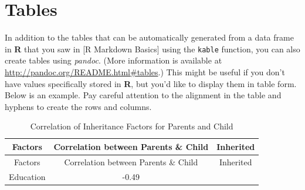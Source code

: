 \documentclass[12pt,twoside]{reedthesis}
\begin{document}
  \section{Tables}\label{tables}
  
  In addition to the tables that can be automatically generated from a
  data frame in \textbf{R} that you saw in {[}R Markdown Basics{]} using
  the \texttt{kable} function, you can also create tables using
  \emph{pandoc}. (More information is available at
  \url{http://pandoc.org/README.html\#tables}.) This might be useful if
  you don't have values specifically stored in \textbf{R}, but you'd like
  to display them in table form. Below is an example. Pay careful
  attention to the alignment in the table and hyphens to create the rows
  and columns.
  
  \begin{longtable}[]{@{}ccc@{}}
  \caption{Correlation of Inheritance Factors for Parents and Child
  \label{tab:inher}}\tabularnewline
  \toprule
  \begin{minipage}[b]{0.29\columnwidth}\centering\strut
  Factors\strut
  \end{minipage} & \begin{minipage}[b]{0.47\columnwidth}\centering\strut
  Correlation between Parents \& Child\strut
  \end{minipage} & \begin{minipage}[b]{0.16\columnwidth}\centering\strut
  Inherited\strut
  \end{minipage}\tabularnewline
  \midrule
  \endfirsthead
  \toprule
  \begin{minipage}[b]{0.29\columnwidth}\centering\strut
  Factors\strut
  \end{minipage} & \begin{minipage}[b]{0.47\columnwidth}\centering\strut
  Correlation between Parents \& Child\strut
  \end{minipage} & \begin{minipage}[b]{0.16\columnwidth}\centering\strut
  Inherited\strut
  \end{minipage}\tabularnewline
  \midrule
  \endhead
  \begin{minipage}[t]{0.29\columnwidth}\centering\strut
  Education\strut
  \end{minipage} & \begin{minipage}[t]{0.47\columnwidth}\centering\strut
  -0.49\strut
  \end{minipage} & \begin{minipage}[t]{0.16\columnwidth}\centering\strut

\end{minipage}
\end{longtable}
\end{document}

